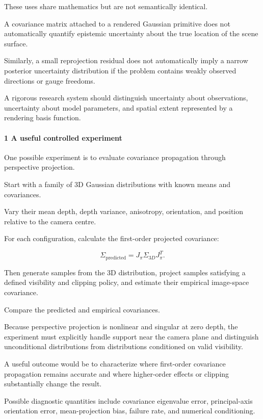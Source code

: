 These uses share mathematics but are not semantically identical.

A covariance matrix attached to a rendered Gaussian primitive does not automatically quantify epistemic uncertainty about the true location of the scene surface.

Similarly, a small reprojection residual does not automatically imply a narrow posterior uncertainty distribution if the problem contains weakly observed directions or gauge freedoms.

A rigorous research system should distinguish uncertainty about observations, uncertainty about model parameters, and spatial extent represented by a rendering basis function.

\paragraph{1 A useful controlled experiment}\label{a-useful-controlled-experiment}

One possible experiment is to evaluate covariance propagation through perspective projection.

Start with a family of 3D Gaussian distributions with known means and covariances.

Vary their mean depth, depth variance, anisotropy, orientation, and position relative to the camera centre.

For each configuration, calculate the first-order projected covariance:

\[
 \Sigma_{\mathrm{predicted}} = J_\pi\Sigma_{3D}J_\pi^T.
\]

Then generate samples from the 3D distribution, project samples satisfying a defined visibility and clipping policy, and estimate their empirical image-space covariance.

Compare the predicted and empirical covariances.

Because perspective projection is nonlinear and singular at zero depth, the experiment must explicitly handle support near the camera plane and distinguish unconditional distributions from distributions conditioned on valid visibility.

A useful outcome would be to characterize where first-order covariance propagation remains accurate and where higher-order effects or clipping substantially change the result.

Possible diagnostic quantities include covariance eigenvalue error, principal-axis orientation error, mean-projection bias, failure rate, and numerical conditioning.

